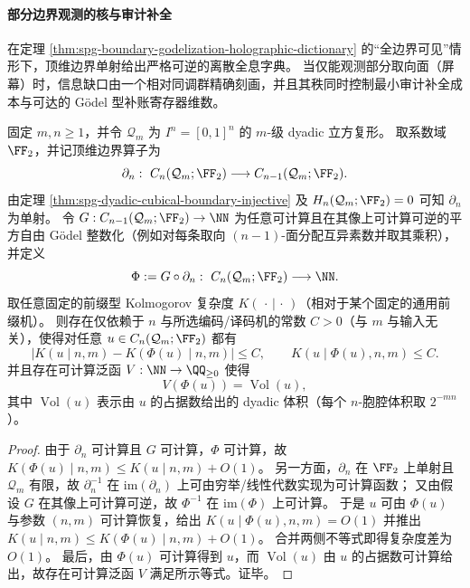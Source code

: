 
\paragraph{部分边界观测的核与审计补全}
在定理 \ref{thm:spg-boundary-godelization-holographic-dictionary} 的“全边界可见”情形下，顶维边界单射给出严格可逆的离散全息字典。
当仅能观测部分取向面（屏幕）时，信息缺口由一个相对同调群精确刻画，并且其秩同时控制最小审计补全成本与可达的 Gödel 型补账寄存器维数。

\begin{theorem}\label{thm:spg-stokes-godel-algorithmic-holographic-completeness}
固定 \(m,n\ge 1\)，并令 \(\mathcal Q_m\) 为 \(I^n=[0,1]^n\) 的 \(m\)-级 dyadic 立方复形。
取系数域 \(\FF_2\)，并记顶维边界算子为
\[
\partial_n:\ C_n(\mathcal Q_m;\FF_2)\longrightarrow C_{n-1}(\mathcal Q_m;\FF_2).
\]
由定理 \ref{thm:spg-dyadic-cubical-boundary-injective} 及 \(H_n(\mathcal Q_m;\FF_2)=0\) 可知 \(\partial_n\) 为单射。
令 \(G:C_{n-1}(\mathcal Q_m;\FF_2)\to\NN\) 为任意可计算且在其像上可计算可逆的平方自由 Gödel 整数化（例如对每条取向 \((n{-}1)\)-面分配互异素数并取其乘积），并定义
\[
\Phi:=G\circ \partial_n:\ C_n(\mathcal Q_m;\FF_2)\longrightarrow \NN.
\]
取任意固定的前缀型 Kolmogorov 复杂度 \(K(\,\cdot\,|\,\cdot\,)\)（相对于某个固定的通用前缀机）。
则存在仅依赖于 \(n\) 与所选编码/译码机的常数 \(C>0\)（与 \(m\) 与输入无关），使得对任意 \(u\in C_n(\mathcal Q_m;\FF_2)\) 都有
\[
\bigl|K(u\mid n,m)-K(\Phi(u)\mid n,m)\bigr|\le C,
\qquad
K(u\mid \Phi(u),n,m)\le C.
\]
并且存在可计算泛函 \(V:\NN\to\QQ_{\ge 0}\) 使得
\[
V(\Phi(u))=\operatorname{Vol}(u),
\]
其中 \(\operatorname{Vol}(u)\) 表示由 \(u\) 的占据数给出的 dyadic 体积（每个 \(n\)-胞腔体积取 \(2^{-mn}\)）。
\end{theorem}
\begin{proof}
由于 \(\partial_n\) 可计算且 \(G\) 可计算，\(\Phi\) 可计算，故 \(K(\Phi(u)\mid n,m)\le K(u\mid n,m)+O(1)\)。
另一方面，\(\partial_n\) 在 \(\FF_2\) 上单射且 \(\mathcal Q_m\) 有限，故 \(\partial_n^{-1}\) 在 \(\mathrm{im}(\partial_n)\) 上可由穷举/线性代数实现为可计算函数；
又由假设 \(G\) 在其像上可计算可逆，故 \(\Phi^{-1}\) 在 \(\mathrm{im}(\Phi)\) 上可计算。
于是 \(u\) 可由 \(\Phi(u)\) 与参数 \((n,m)\) 可计算恢复，给出
\(
K(u\mid \Phi(u),n,m)=O(1)
\)
并推出 \(K(u\mid n,m)\le K(\Phi(u)\mid n,m)+O(1)\)。
合并两侧不等式即得复杂度差为 \(O(1)\)。
最后，由 \(\Phi(u)\) 可计算得到 \(u\)，而 \(\operatorname{Vol}(u)\) 由 \(u\) 的占据数可计算给出，故存在可计算泛函 \(V\) 满足所示等式。证毕。
\end{proof}

